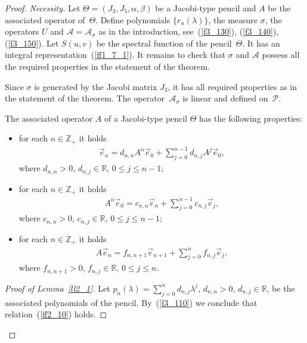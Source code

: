 \begin{proof} \textit{Necessity.} Let $\Theta = ( J_3, J_5, \alpha, \beta )$ be a Jacobi-type pencil and $A$ be the associated operator of~$\Theta$. Def\/ine polynomials $\{ r_n(\lambda) \}$, the measure $\sigma$, the operators $U$ and $\mathcal{A}=\mathcal{A}_\sigma$ as in the introduction, see~(\ref{f3_130}), (\ref{f3_140}), (\ref{f3_150}). Let $S(u,v)$ be the spectral function of the pencil~$\Theta$. It has an integral representation~(\ref{ff1_7_1}). It remains to check that $\sigma$ and $\mathcal{A}$ possess all the required properties in the statement of the theorem.

Since $\sigma$ is generated by the Jacobi matrix $J_3$, it has all required properties as in the statement of the theorem. The operator~$\mathcal{A}_\sigma$ is linear and def\/ined on~$\mathcal{P}$.

\begin{Lemma}\label{ll2_1} The associated operator $A$ of a Jacobi-type pencil $\Theta$ has the following properties:
\begin{itemize}\itemsep=0pt
\item[$1)$] for each $n\in\mathbb{Z}_+$ it holds
\begin{gather} \label{ff2_10}
\vec e_n = d_{n,n} A^n \vec e_0 + \sum_{j=0}^{n-1} d_{n,j} A^j \vec e_0,
\end{gather}
where $d_{n,n} > 0$, $d_{n,j}\in\mathbb{R}$, $0\leq j\leq n-1$;

\item[$2)$] for each $n\in\mathbb{Z}_+$ it holds
\begin{gather}\label{ff2_12}
A^n \vec e_0 = c_{n,n} \vec e_n + \sum_{j=0}^{n-1} c_{n,j} \vec e_j,
\end{gather}
where $c_{n,n} > 0$, $c_{n,j}\in\mathbb{R}$, $0\leq j\leq n-1$;

\item[$3)$] for each $n\in\mathbb{Z}_+$ it holds
\begin{gather}\label{ff2_14}
A \vec e_n = f_{n,n+1} \vec e_{n+1} + \sum_{j=0}^{n} f_{n,j} \vec e_j,
\end{gather}
where $f_{n,n+1} > 0$, $f_{n,j}\in\mathbb{R}$, $0\leq j\leq n$.
\end{itemize}
\end{Lemma}

\begin{proof}[Proof of Lemma~\ref{ll2_1}] Let $p_n(\lambda) = \sum\limits_{j=0}^n d_{n,j} \lambda^j$, $d_{n,n}>0$, $d_{n,j}\in\mathbb{R}$, be the associated polyno\-mials of the pencil. By~(\ref{f3_110}) we conclude that relation~(\ref{ff2_10}) holds.


\end{proof}
\end{proof}
